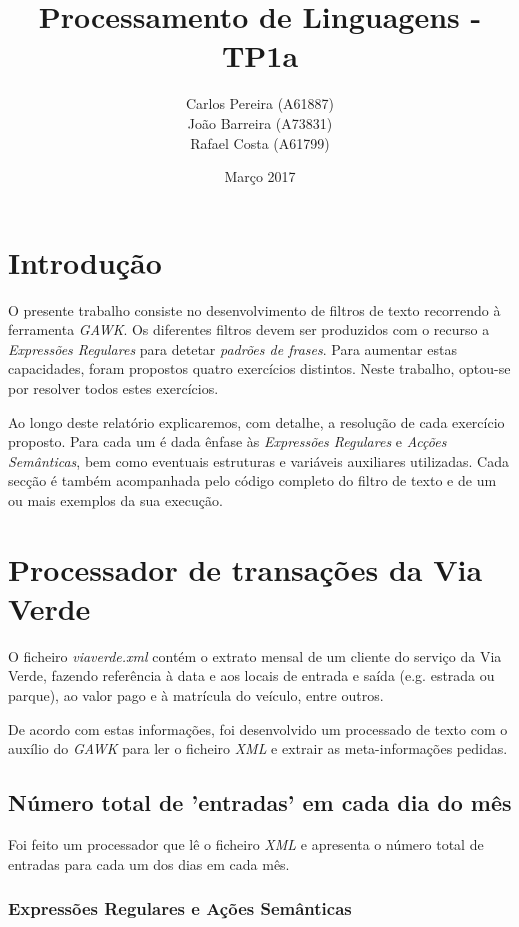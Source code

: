 \documentclass{article}
\title{\textbf{Processamento de Linguagens - TP1a}}
\author{\begin{tabular}{c}
            \textbf{} Carlos Pereira (A61887) \\ João Barreira (A73831) \\ Rafael Costa (A61799)
        \end{tabular}
       }
\date{Março 2017}
\begin{document}
\maketitle

\renewcommand*\contentsname{Índice}
\tableofcontents

\section{Introdução}

O presente trabalho consiste no desenvolvimento de filtros de texto recorrendo à ferramenta \emph{GAWK}. Os diferentes filtros devem ser produzidos com o recurso a \emph{Expressões Regulares} para detetar \emph{padrões de frases}. Para aumentar estas capacidades, foram propostos quatro exercícios distintos. Neste trabalho, optou-se por resolver todos estes exercícios.

Ao longo deste relatório explicaremos, com detalhe, a resolução de cada exercício proposto. Para cada um é dada ênfase às \emph{Expressões Regulares} e \emph{Acções Semânticas}, bem como eventuais estruturas e variáveis auxiliares utilizadas. Cada secção é também acompanhada pelo código completo do filtro de texto e de um ou mais exemplos da sua execução.

\section{Processador de transações da Via Verde}

O ficheiro \emph{viaverde.xml} contém o extrato mensal de um cliente do serviço da Via Verde, fazendo referência à data e aos locais de entrada e saída (e.g. estrada ou parque), ao valor pago e à matrícula do veículo, entre outros.

De acordo com estas informações, foi desenvolvido um processado de texto com o auxílio do \emph{GAWK} para ler o ficheiro \emph{XML} e extrair as meta-informações pedidas.

\subsection{Número total de 'entradas' em cada dia do mês}

Foi feito um processador que lê o ficheiro \emph{XML} e apresenta o número total de entradas para cada um dos dias em cada mês.

\subsubsection{Expressões Regulares e Ações Semânticas}
\end{document}
